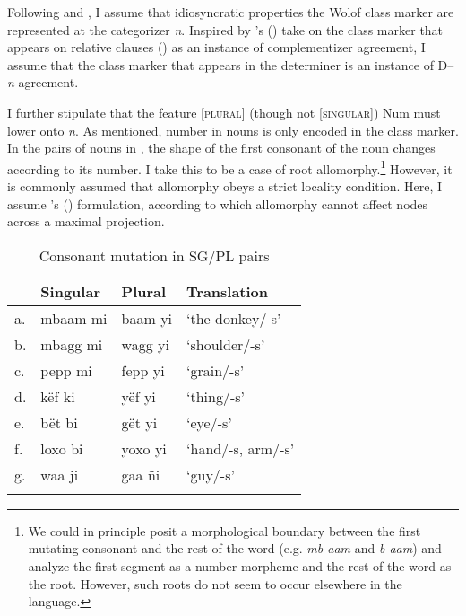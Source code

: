 \documentclass[output=paper]{langscibook}
\begin{document}
\noindent   Following \citet{kihm2005noun} and \citet{acquaviva2009roots}, I assume that idiosyncratic properties the Wolof class marker are represented at the categorizer \textit{n}. Inspired by \citeauthor{torrence2013clause}'s (\citeyear{torrence2013clause}) take on the class marker that appears on relative clauses () as an instance of complementizer agreement, I assume that the class marker that appears in the determiner is an instance of D--\textit{n} agreement.
		
I further stipulate that the feature [\textsc{plural}] (though not [\textsc{singular}]) Num must lower onto \textit{n}. As mentioned, number in nouns is only encoded in the class marker. In the pairs of nouns in , the shape of the first consonant of the noun changes according to its number. I take this to be a case of root allomorphy.\footnote{We could in principle posit a morphological boundary between the first mutating consonant and the rest of the word (e.g. \textit{mb-aam} and \textit{b-aam}) and analyze the first segment as a number morpheme and the rest of the word as the root. However, such roots do not seem to occur elsewhere in the language.} However, it is commonly assumed that allomorphy obeys a strict locality condition. Here, I assume \citeauthor{bobaljik2012universals}'s (\citeyear{bobaljik2012universals}) formulation, according to which allomorphy cannot affect nodes across a maximal projection.
				
				\begin{table}
				\caption{Consonant mutation in SG/PL pairs \citep{loporcaroBabou16}}
				\label{fon:pLSgGGaAWaA}
				\begin{tabular}{llll}
				    \lsptoprule
						& Singular & Plural & Translation\\
						\midrule
						a. & mbaam mi & baam yi & `the donkey/-s'\\
						b. & mbagg mi & wagg yi & `shoulder/-s'\\
						c. & pepp mi & fepp yi & `grain/-s'\\
						d. & këf ki & yëf yi & `thing/-s'\\
						e. & bët bi & gët yi & `eye/-s'\\
						f. & loxo bi & yoxo yi & `hand/-s, arm/-s'\\
						g. & waa ji & gaa ñi & `guy/-s'\\
					\lspbottomrule
				\end{tabular}
				\end{table}
\end{document}
